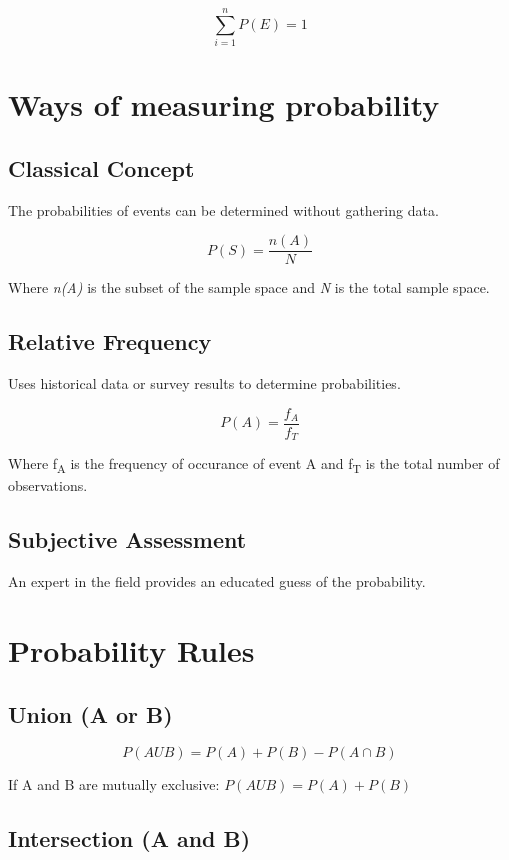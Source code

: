\documentclass[11pt]{article}
\begin{document}
\[
\sum\limits_{i=1}^{n} P(E) = 1
\] 
\section{Ways of measuring probability}
\label{sec:org407d619}

\subsection{Classical Concept}
\label{sec:orgd1afeb8}

The probabilities of events can be determined without gathering data.

\[
P(S) = \frac{n(A)}{N}
\]

Where \emph{n(A)} is the subset of the sample space and \emph{N} is the total sample space.
\subsection{Relative Frequency}
\label{sec:orgf0e611a}

Uses historical data or survey results to determine probabilities.

\[
P(A) = \frac{f_{A}}{f_{T}}
\]

Where f\textsubscript{A} is the frequency of occurance of event A and f\textsubscript{T} is the total number of observations.
\subsection{Subjective Assessment}
\label{sec:orgcb2d69d}

An expert in the field provides an educated guess of the probability.
\section{Probability Rules}
\label{sec:org8283439}

\subsection{Union (A or B)}
\label{sec:org206559d}

\[
P(A U B) = P(A) + P(B) - P(A \cap B)
\]

If A and B are mutually exclusive: \(P(A U B) = P(A) + P(B)\) 
\subsection{Intersection (A and B)}
\label{sec:orgf551cbe}
\end{document}

